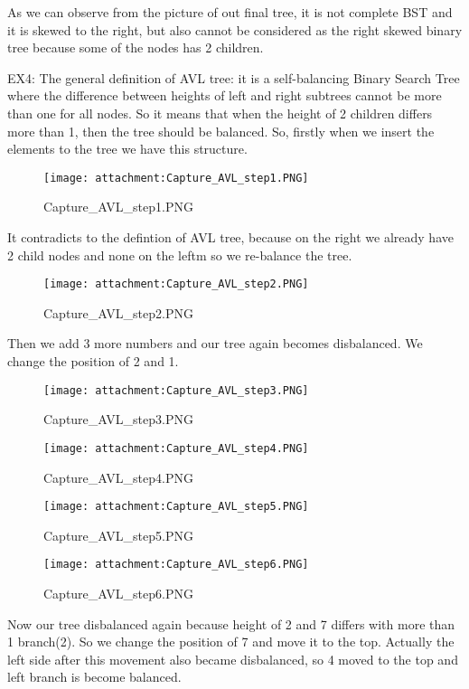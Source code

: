 \documentclass[11pt]{article}
\makeatletter
\def\maxwidth{\ifdim\Gin@nat@width>\linewidth\linewidth
    \else\Gin@nat@width\fi}
\let\Oldincludegraphics\includegraphics
\renewcommand{\includegraphics}[1]{\Oldincludegraphics[width=.8\maxwidth]{#1}}
\makeatother
\begin{document}
    As we can observe from the picture of out final tree, it is not complete
BST and it is skewed to the right, but also cannot be considered as the
right skewed binary tree because some of the nodes has 2 children.

    EX4: The general definition of AVL tree: it is a self-balancing Binary
Search Tree where the difference between heights of left and right
subtrees cannot be more than one for all nodes. So it means that when
the height of 2 children differs more than 1, then the tree should be
balanced. So, firstly when we insert the elements to the tree we have
this structure.

    \begin{figure}
\centering
\texttt{[image: attachment:Capture\_AVL\_step1.PNG]}
\caption{Capture\_AVL\_step1.PNG}
\end{figure}

    It contradicts to the defintion of AVL tree, because on the right we
already have 2 child nodes and none on the leftm so we re-balance the
tree.

    \begin{figure}
\centering
\texttt{[image: attachment:Capture\_AVL\_step2.PNG]}
\caption{Capture\_AVL\_step2.PNG}
\end{figure}

    Then we add 3 more numbers and our tree again becomes disbalanced. We
change the position of 2 and 1.

    \begin{figure}
\centering
\texttt{[image: attachment:Capture\_AVL\_step3.PNG]}
\caption{Capture\_AVL\_step3.PNG}
\end{figure}

    \begin{figure}
\centering
\texttt{[image: attachment:Capture\_AVL\_step4.PNG]}
\caption{Capture\_AVL\_step4.PNG}
\end{figure}

    \begin{figure}
\centering
\texttt{[image: attachment:Capture\_AVL\_step5.PNG]}
\caption{Capture\_AVL\_step5.PNG}
\end{figure}

    \begin{figure}
\centering
\texttt{[image: attachment:Capture\_AVL\_step6.PNG]}
\caption{Capture\_AVL\_step6.PNG}
\end{figure}

    Now our tree disbalanced again because height of 2 and 7 differs with
more than 1 branch(2). So we change the position of 7 and move it to the
top. Actually the left side after this movement also became disbalanced,
so 4 moved to the top and left branch is become balanced.
\end{document}
